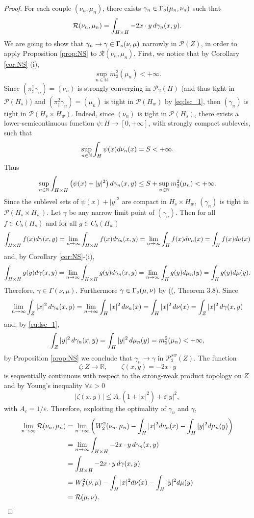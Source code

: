 \documentclass[12pt,a4paper]{article}
\newcommand{\e}{\varepsilon}
\newcommand{\N}{\mathbb{N}}
\newcommand{\R}{\mathbb{R}}
\renewcommand{\P}{\mathcal{P}}
\renewcommand{\d}{{\rm d}}
\newcommand{\X}{\mathcal{P}_2(H)}
\theoremstyle{plain}
\theoremstyle{definition}
\begin{document}
\begin{proof}
For each couple $(\nu_n, \mu_n)$, there exists $\gamma_n \in \Gamma_{\rm o}(\mu_n,\nu_n)$ such that
\[
	\mathcal R(\nu_n, \mu_n)=\int_{H \times H}-2x\cdot y\,\d\gamma_n(x,y).
\]
We are going to show that $\gamma_n \to \gamma \in \Gamma_{\rm o}(\nu,\mu)$ narrowly in $\P(Z)$, in order to apply Proposition \ref{prop:NS} to $\mathcal R(\nu_n,\mu_n)$. First, we notice that by Corollary \ref{cor:NS}-(i),
\begin{equation}
\label{eq:lsc_1}
	\sup_{n\in \N}m_2^2(\mu_n)<+\infty.
\end{equation}
Since $(\pi_\sharp^1\gamma_n)=(\nu_n)$ is strongly converging in $\X$ (and thus tight in $\P(H_s)$) and $(\pi_\sharp^2\gamma_n)=(\mu_n)$ is tight in $\P(H_w)$ by \eqref{eq:lsc_1}, then $(\gamma_n)$ is tight in $\P(H_s \times H_w)$. Indeed, since $(\nu_n)$ is tight in $\P(H_s)$, there exists a lower-semicontinuous function $\psi:H\to [0,+\infty]$, with strongly compact sublevels, such that
\[
	\sup_{n\in\N}\int_H \psi(x)\d\nu_n(x)=S<+\infty.
\]  
Thus
\[
	\sup_{n\in\N}\int_{H\times H}\left(\psi(x) +|y|^2\right)\d\gamma_n(x,y) \leq S +\sup_{n\in \N}m_2^2(\mu_n) < +\infty.
\]
Since the sublevel sets of $\psi(x) +|y|^2$ are compact in $H_s \times H_w$, $(\gamma_n)$ is tight in $\P(H_s \times H_w)$. Let $\gamma$ be any narrow limit point of $(\gamma_n)$. Then for all $f\in C_b(H_s)$ and for all $g \in C_b(H_w)$
\[
	\int_{H\times H} f(x)\d\gamma(x,y) = \lim_{n \to \infty} \int_{H\times H} f(x)\d\gamma_n(x,y) =  \lim_{n \to \infty} \int_H f(x)\d\nu_n(x)  =\int_H f(x)\d\nu(x)
\]
and, by Corollary \ref{cor:NS}-(i),
\[
	\int_{H\times H} g(y)\d\gamma(x,y) = \lim_{n \to \infty} \int_{H\times H} g(y)\d\gamma_n(x,y) = \lim_{n \to \infty} \int_H g(y)\d\mu_n(y)  = \int_H g(y)\d\mu(y).
\]
Therefore, $\gamma\in \Gamma(\nu,\mu).$ Furthermore $\gamma \in \Gamma_{\rm o}(\mu,\nu)$ by ((\cite{naldi-savare}, Theorem 3.8). Since 
\[
	\lim_{n \to \infty} \int_Z |x|^2\, \d\gamma_n(x,y) = 	\lim_{n \to \infty} \int_{H} |x|^2\, \d\nu_n(x) = \int_{H} |x|^2\, \d\nu(x) =\int_Z |x|^2\, \d\gamma(x,y)
\]
and, by \eqref{eq:lsc_1},
\[
	\int_Z |y|^2\, \d\gamma_n(x,y) =\int_{H} |y|^2\, \d\mu_n(y) = m_2^2(\mu_n) <+\infty,
\]
by Proposition \ref{prop:NS} we conclude that $\gamma_n \to \gamma$ in $\P_2^{sw}(Z)$. The function 
\[
	\zeta:Z \to \R,\qquad \zeta(x,y)=-2x\cdot y
\]	 
is sequentially continuous with respect to the strong-weak product topology on $Z$ and by Young's inequality $\forall \e >0$
\[
	  |\zeta(x,y)|  \leq  A_\e \left(1+|x|^2\right)+\e|y|^2,
\]
with $A_\e=1/\e$. Therefore, exploiting the optimality of $\gamma_n$ and $\gamma$,
\begin{align*}
	\lim_{n\to \infty}\mathcal R(\nu_n,\mu_n)&= \lim_{n\to \infty} \left(W_2^2(\nu_n,\mu_n)-\int_H|x|^2\d\nu_n(x)-\int_H|y|^2\d\mu_n(y)\right)\\
	&= \lim_{n\to \infty} \int_{H \times H}-2x\cdot y\,\d\gamma_n(x,y) \\
	&= \int_{H \times H}-2x\cdot y\,\d\gamma(x,y) \\
	&= W_2^2(\nu,\mu)-\int_H|x|^2\d\nu(x)-\int_H|y|^2\d\mu(y)\\
	&=\mathcal R(\mu,\nu).
\end{align*}
\end{proof}
\end{document}
